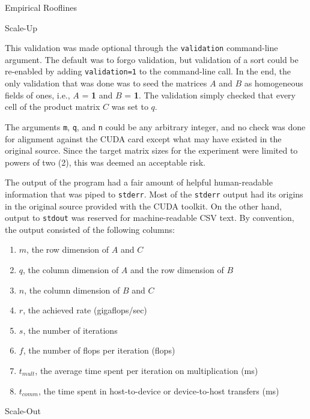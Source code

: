 \documentclass{article}
\begin{document}
\begin{section}{Empirical Rooflines}
\begin{subsection}{Scale-Up}
\begin{paragraph}{}
      This validation was made optional through the \texttt{validation} command-line argument. The default was to forgo validation, but validation of a sort
      could be re-enabled by adding \texttt{validation=1} to the command-line call. In the end, the only validation that was done was to seed the matrices $A$
      and $B$ as homogeneous fields of ones, i.e., $A$ = \textbf{1} and $B$ = \textbf{1}. The validation simply checked that every cell of the product matrix
      $C$ was set to $q$.
    \end{paragraph}
    \begin{paragraph}{}
      The arguments \texttt{m}, \texttt{q}, and \texttt{n} could be any arbitrary integer, and no check was done for alignment against the CUDA card
      except what may have existed in the original source. Since the target matrix sizes for the experiment were limited to powers of two (2), this was deemed
      an acceptable risk.
    \end{paragraph}
    \begin{paragraph}{}
      The output of the program had a fair amount of helpful human-readable information that was piped to \texttt{stderr}. Most of the \texttt{stderr} output
      had its origins in the original source provided with the CUDA toolkit. On the other hand, output to \texttt{stdout} was reserved for machine-readable CSV text.
      By convention, the output consisted of the following columns:
      \begin{enumerate}
      \item{$m$, the row dimension of $A$ and $C$}
      \item{$q$, the column dimension of $A$ and the row dimension of $B$}
      \item{$n$, the column dimension of $B$ and $C$}
      \item{$r$, the achieved rate (gigaflops/sec)}
      \item{$s$, the number of iterations}
      \item{$f$, the number of flops per iteration (flops)}
      \item{$t_{mult}$, the average time spent per iteration on multiplication (ms)}
      \item{$t_{comm}$, the time spent in host-to-device or device-to-host transfers (ms)}
      \end{enumerate}
    \end{paragraph}
  \end{subsection}
  \begin{subsection}{Scale-Out}

\end{subsection}
\end{section}
\end{document}

